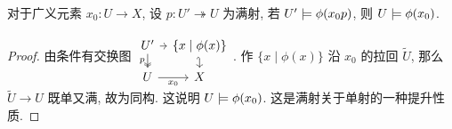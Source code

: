 \begin{prop}
	[label={epi-forcing}]
	{}
	对于广义元素 $x_0 \colon U\to X$, 设 $p\colon U' \twoheadrightarrow U$ 为满射, 若 $U'\models\phi(x_0 p)$, 则 $U\models \phi(x_0)$.
\end{prop}
\begin{proof}
	由条件有交换图
	$\begin{tikzcd}[ampersand replacement=\&,row sep=small,column sep=tiny]
		{U'} \& {\{x\mid\phi(x)\}} \\
		U \& X
		\arrow["p"', two heads, from=1-1, to=2-1]
		\arrow[from=1-1, to=1-2]
		\arrow[hook', from=1-2, to=2-2]
		\arrow["x_0"', from=2-1, to=2-2]
	\end{tikzcd}$.
	作 $\{x\mid\phi(x)\}$ 沿 $x_0$ 的拉回 $\widetilde {U}$,
	那么 $\widetilde U \to U$ 既单又满, 故为同构.
	这说明 $U\models \phi(x_0)$.
	这是满射关于单射的一种提升性质.
\end{proof}

